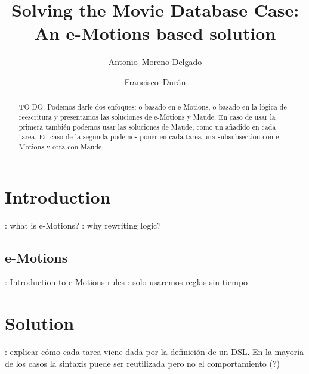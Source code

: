 \documentclass[draft]{llncs}
\newcommand{\todo}[1]{\textbf{\color{red}{TO-DO}}: #1}
\newcommand{\todo}[1]{}
\begin{document}
\pagestyle{headings} %

\title{Solving the Movie Database Case: An e-Motions based solution}

\author{Antonio~Moreno-Delgado \and Francisco~Dur\'an}



\maketitle

\begin{abstract}
TO-DO. Podemos darle dos enfoques: o basado en e-Motions, o basado en la lógica de reescritura y presentamos las soluciones de e-Motions y Maude. En caso de usar la primera también podemos usar las soluciones de Maude, como un añadido en cada tarea. En caso de la segunda podemos poner en cada tarea una subsubsection con e-Motions y otra con Maude.
\end{abstract}

\section{Introduction}\label{sec:intro}

\todo{what is e-Motions?}
\todo{why rewriting logic?}

\subsection{e-Motions}\label{sub:emotions}
\todo{Introduction to e-Motions rules}
\todo{solo usaremos reglas sin tiempo}
\section{Solution}\label{sec:solution}
\todo{explicar cómo cada tarea viene dada por la definición de un DSL. En la mayoría de los casos la sintaxis puede ser reutilizada pero no el comportamiento (?)}
\end{document}
